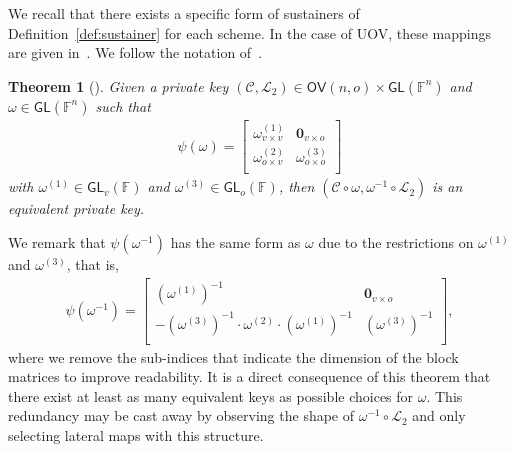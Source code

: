 \documentclass[12pt, a4paper, oneside]{memoir}
\newtheorem{theorem}{Theorem}[section]
\theoremstyle{definition}
\begin{document}
We recall that there exists a specific form of sustainers of Definition~\ref{def:sustainer} for each scheme. In the case of UOV, these mappings are given in~\cite[Section 4.3]{Wolf:201104}. We follow the notation of~\cite{Petzoldt:201307}.

\begin{theorem}[{\cite[Theorem 4.15]{Wolf:201104}}]
  Given a private key $(\mathcal{C}, \mathcal{L}_{2}) \in \mathsf{OV}(n, o) \times \mathsf{GL}(\mathbb{F}^{n})$ and $\omega \in \mathsf{GL}(\mathbb{F}^{n})$ such that
  \begin{align}
    \psi(\omega) =
    \begin{bmatrix}
      \omega_{v \times v}^{(1)} & \mathbf{0}_{v \times o} \\
      \omega_{o \times v}^{(2)} & \omega_{o \times o}^{(3)} \\
    \end{bmatrix}
  \end{align}
  with $\omega^{(1)} \in \mathsf{GL}_{v}(\mathbb{F})$ and $\omega^{(3)} \in \mathsf{GL}_{o}(\mathbb{F})$, then $(\mathcal{C} \circ \omega, \omega^{-1} \circ \mathcal{L}_{2})$ is an equivalent private key.
\end{theorem}

We remark that $\psi(\omega^{-1})$ has the same form as $\omega$ due to the restrictions on $\omega^{(1)}$ and $\omega^{(3)}$, that is,
\begin{align}
  \psi(\omega^{-1}) =
  \begin{bmatrix}
    (\omega^{(1)})^{-1}                                                 & \mathbf{0}_{v \times o}   \\
    -(\omega^{(3)})^{-1} \cdot \omega^{(2)} \cdot (\omega^{(1)})^{-1}   & (\omega^{(3)})^{-1}       \\
  \end{bmatrix},
\end{align}
where we remove the sub-indices that indicate the dimension of the block matrices to improve readability. It is a direct consequence of this theorem that there exist at least as many equivalent keys as possible choices for $\omega$. This redundancy may be cast away by observing the shape of $\omega^{-1} \circ \mathcal{L}_{2}$ and only selecting lateral maps with this structure.
\end{document}
